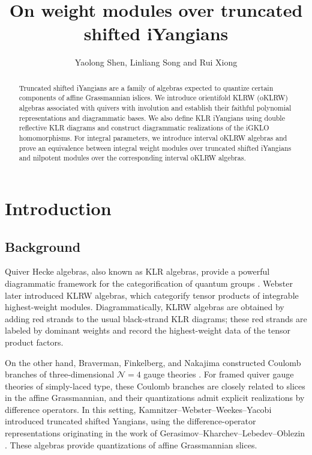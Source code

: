 \documentclass[12pt,openany]{amsart}
\title{On weight modules over truncated shifted iYangians}
\author{Yaolong Shen, Linliang Song and Rui Xiong}
\begin{document}
\begin{abstract}
Truncated shifted iYangians are a family of algebras expected to
quantize certain components of affine Grassmannian islices.
We introduce orientifold KLRW (oKLRW) algebras associated with quivers
with involution and establish their faithful polynomial representations
and diagrammatic bases. We also define KLR iYangians using double reflective KLR diagrams and construct diagrammatic realizations of the iGKLO homomorphisms. For integral parameters, we introduce interval oKLRW algebras and prove an equivalence between integral weight modules over truncated shifted iYangians and nilpotent modules over the corresponding interval oKLRW algebras.
\end{abstract}


\maketitle

\tableofcontents 

\section{Introduction}
\subsection{Background}
Quiver Hecke algebras, also known as KLR algebras, provide a powerful diagrammatic framework for the categorification of quantum groups \cite{KL09,Rou}.  Webster \cite{Web17a} later introduced KLRW algebras, which categorify tensor products of integrable highest-weight modules.  Diagrammatically, KLRW algebras are obtained by adding red strands to the usual black-strand KLR diagrams; these red strands are labeled by dominant weights and record the highest-weight data of the tensor product factors.

On the other hand, Braverman, Finkelberg, and Nakajima constructed Coulomb branches of three-dimensional $\mathcal N=4$ gauge theories \cite{BFN18}. For framed quiver gauge theories of simply-laced type, these Coulomb branches are closely related to slices in the affine Grassmannian, and their quantizations admit explicit realizations by difference operators. In this setting, Kamnitzer--Webster--Weekes--Yacobi \cite{KWWY14} introduced truncated
shifted Yangians, using the difference-operator representations originating in the work of Gerasimov--Kharchev--Lebedev--Oblezin \cite{GKLO05}.
These algebras provide quantizations of affine Grassmannian slices.
\end{document}
